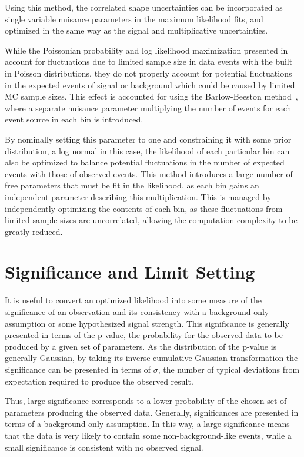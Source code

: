 Using this method, the correlated shape uncertainties can be incorporated as single variable nuisance parameters in the maximum likelihood fits, and optimized in the same way as the signal and multiplicative uncertainties.

While the Poissonian probability and log likelihood maximization presented in  account for fluctuations due to limited sample size in data events with the built in Poisson distributions, they do not properly account for potential fluctuations in the expected events of signal or background which could be caused by limited MC sample sizes.
This effect is accounted for using the Barlow-Beeston method~\cite{BarlowBeeston}, where a separate nuisance parameter multiplying the number of events for each event source in each bin is introduced.

By nominally setting this parameter to one and constraining it with some prior distribution, a log normal in this case, the likelihood of each particular bin can also be optimized to balance potential fluctuations in the number of expected events with those of observed events.
This method introduces a large number of free parameters that must be fit in the likelihood, as each bin gains an independent parameter describing this multiplication.
This is managed by independently optimizing the contents of each bin, as these fluctuations from limited sample sizes are uncorrelated, allowing the computation complexity to be greatly reduced.

\section{Significance and Limit Setting}
It is useful to convert an optimized likelihood into some measure of the significance of an observation and its consistency with a background-only assumption or some hypothesized signal strength. 
This significance is generally presented in terms of the p-value, the probability for the observed data to be produced by a given set of parameters. 
As the distribution of the p-value is generally Gaussian, by taking its inverse cumulative Gaussian transformation the significance can be presented in terms of $\sigma$, the number of typical deviations from expectation required to produce the observed result.

Thus, large significance corresponds to a lower probability of the chosen set of parameters producing the observed data.
Generally, significances are presented in terms of a background-only assumption. 
In this way, a large significance means that the data is very likely to contain some non-background-like events, while a small significance is consistent with no observed signal.

